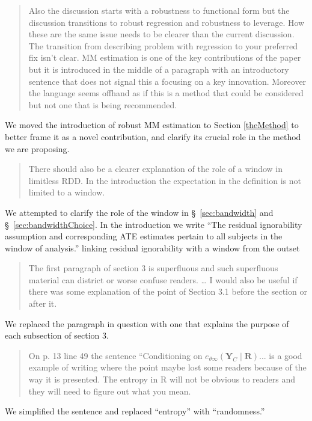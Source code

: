 \documentclass[12pt]{article}
\begin{document}
\begin{itemize}
\begin{quote}
Also the discussion starts with a robustness to functional form but
the discussion transitions to robust regression and robustness to
leverage. How these are the same issue needs to be clearer than the
current discussion. The transition from describing problem with
regression to your preferred fix isn’t clear. MM estimation is one of
the key contributions of the paper but it is introduced in the middle
of a paragraph with an introductory sentence that does not signal this
a focusing on a key innovation. Moreover the language seems offhand as
if this is a method that could be considered but not one that is being
recommended.
\end{quote}
We moved the introduction of robust MM estimation to Section
\ref{theMethod} to better frame it as a novel contribution, and
clarify its crucial role in the method we are proposing.

\begin{quote}
There should also be a clearer explanation of the role of a window in
limitless RDD. In the introduction the expectation in the definition
is not limited to a window.
\end{quote}
We attempted to clarify the role of the window in
\S~\ref{sec:bandwidth} and \S~\ref{sec:bandwidthChoice}. In the
introduction we write ``The residual ignorability assumption and corresponding ATE
estimates pertain to all subjects in the window of analysis.'' linking
residual ignorability with a window from the outset 

\begin{quote}
The first paragraph of section 3 is superfluous and such superfluous
material can district or worse confuse readers. \dots
I would also be useful if there
was some explanation of the point of Section 3.1 before the section or
after it.
\end{quote}
We replaced the paragraph in question with one that explains the
purpose of each subsection of section 3.

\begin{quote}
On p. 13 line 49 the sentence “Conditioning on $e_{\theta\infty}(\mathbf{Y}_C \mid \mathbf{R})$... is a good example of
writing where the point maybe lost some readers because of the way it
is presented. The entropy in R will not be obvious to readers and they
will need to figure out what you mean.
\end{quote}
We simplified the sentence and replaced ``entropy'' with
``randomness.''


\end{itemize}
\end{document}
